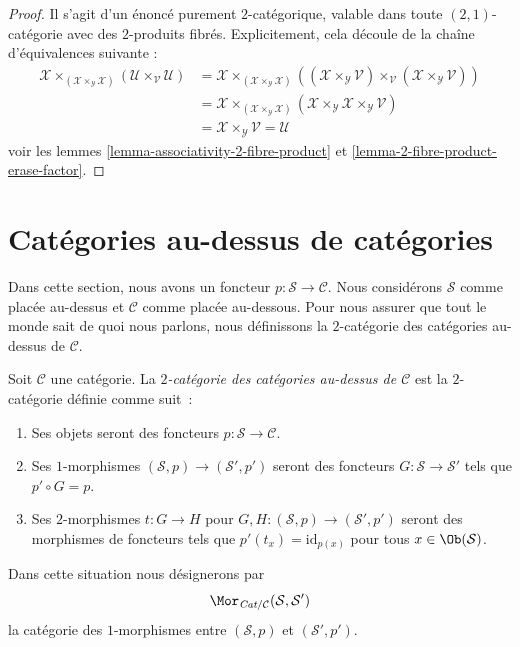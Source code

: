 \begin{proof}
Il s'agit d'un énoncé purement $2$-catégorique, valable dans
toute $(2, 1)$-catégorie avec des $2$-produits fibrés. Explicitement, cela
découle de la chaîne d’équivalences suivante :
\begin{align*}
\mathcal{X} \times_{(\mathcal{X} \times_\mathcal{Y} \mathcal{X})}
(\mathcal{U} \times_\mathcal{V} \mathcal{U})
& =
\mathcal{X} \times_{(\mathcal{X} \times_\mathcal{Y} \mathcal{X})}
((\mathcal{X} \times_\mathcal{Y} \mathcal{V})
\times_\mathcal{V} (\mathcal{X} \times_\mathcal{Y} \mathcal{V})) \\
& =
\mathcal{X} \times_{(\mathcal{X} \times_\mathcal{Y} \mathcal{X})}
(\mathcal{X} \times_\mathcal{Y} \mathcal{X}
\times_\mathcal{Y} \mathcal{V}) \\
& =
\mathcal{X} \times_\mathcal{Y} \mathcal{V} = \mathcal{U}
\end{align*}
voir les lemmes \ref{lemma-associativity-2-fibre-product} et
\ref{lemma-2-fibre-product-erase-factor}.
\end{proof}








\section{Catégories au-dessus de catégories}
\label{section-categories-over-categories}

\noindent
Dans cette section, nous avons un foncteur $p : \mathcal{S} \to \mathcal{C}$.
Nous considérons $\mathcal{S}$ comme placée au-dessus et $\mathcal{C}$ comme
placée au-dessous. Pour nous
assurer que tout le monde sait de quoi nous parlons, nous définissons la
$2$-catégorie des catégories au-dessus de $\mathcal{C}$.

\begin{definition}
\label{definition-categories-over-C}
Soit $\mathcal{C}$ une catégorie. La {\it $2$-catégorie des catégories au-dessus de
$\mathcal{C}$} est la $2$-catégorie définie comme suit :
\begin{enumerate}
\item Ses objets seront des foncteurs $p : \mathcal{S} \to \mathcal{C}$.
\item Ses $1$-morphismes $(\mathcal{S}, p) \to (\mathcal{S}', p')$ seront des
foncteurs $G : \mathcal{S} \to \mathcal{S}'$ tels que $p' \circ G = p$.
\item Ses $2$-morphismes $t : G \to H$ pour $G, H : (\mathcal{S}, p) \to (\mathcal{S}', p')$ seront des morphismes de foncteurs tels que $p'(t_x) = \text{id}_{p(x)}$ pour tous $x \in \Ob(\mathcal{S})$.
\end{enumerate}
Dans cette situation nous désignerons par
$$
\Mor_{\textit{Cat}/\mathcal{C}}(\mathcal{S}, \mathcal{S}')
$$
la catégorie des $1$-morphismes entre $(\mathcal{S}, p)$ et $(\mathcal{S}', p')$.
\end{definition}


